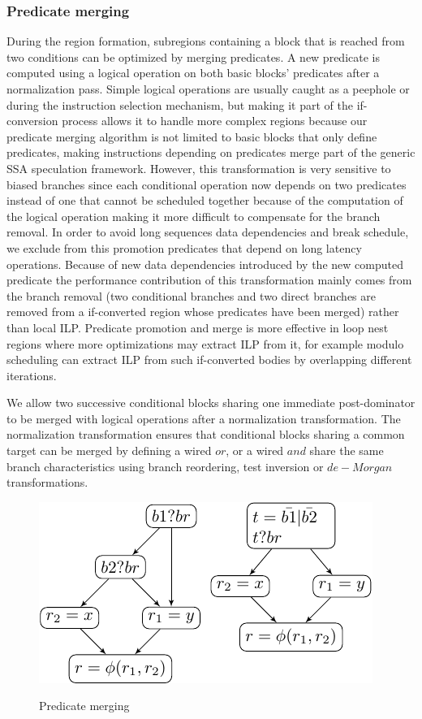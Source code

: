 \subsubsection{Predicate merging}

During the region formation, subregions containing a block that is reached from two conditions can be optimized by merging predicates. A new predicate is computed using a logical operation on both basic blocks' predicates after a normalization pass. Simple logical operations are usually caught as a peephole or during the instruction selection mechanism, but making it part of the if-conversion process allows it to handle more complex regions because our predicate merging algorithm is not limited to basic blocks that only define predicates, making instructions depending on predicates merge part of the generic SSA speculation framework. However, this transformation is very sensitive to biased branches since each conditional operation now depends on two predicates instead of one that cannot be scheduled together because of the computation of the logical operation making it more difficult to compensate for the branch removal. In order to avoid long sequences data dependencies and break schedule, we exclude from this promotion predicates that depend on long latency operations.
Because of new data dependencies introduced by the new computed predicate the performance contribution of this transformation mainly comes from the branch removal (two conditional branches and two direct branches are removed from a if-converted region whose predicates have been merged) rather than local ILP. Predicate promotion and merge is more effective in loop nest regions where more optimizations may extract ILP from it, for example modulo scheduling can extract ILP from such if-converted bodies by overlapping different iterations. 

We allow two successive conditional blocks sharing one immediate post-dominator to be merged with logical operations after a normalization transformation. The normalization transformation ensures that conditional blocks sharing a common target can be merged by defining a wired $or$, or a wired $and$ share the same branch characteristics using branch reordering, test inversion or $de-Morgan$ transformations.

\begin{figure}
  \includegraphics[scale=0.8]{phi_merge}
  \label{fig:phi_merge}
\caption{Predicate merging}
\end{figure}

